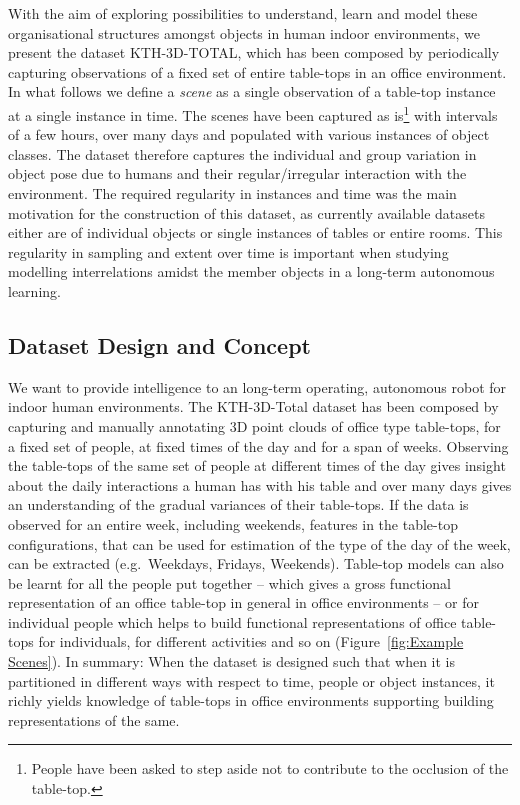 \documentclass[letterpaper, 10 pt, conference]{ieeeconf}  %
\begin{document}
With the aim of exploring possibilities to understand, learn and model these organisational structures amongst objects in human indoor 
environments, we present the dataset KTH-3D-TOTAL, which has been composed by periodically capturing observations of a fixed set of entire 
table-tops in an office environment. In what follows we define a \textit{scene} as a single observation of a table-top instance at a single 
instance in time. The scenes have been captured as is\footnote{People have been asked to step aside not to contribute to the occlusion of 
the table-top.} with intervals of a few hours, over many days and populated with various instances of object classes. The dataset therefore 
captures the individual and group variation in object pose due to humans and their regular/irregular interaction with the environment. The 
required regularity in instances and time was the main motivation for the construction of this dataset, as currently available datasets 
either are of individual objects or single instances of tables or entire rooms. This regularity in sampling and extent over time is 
important when studying modelling interrelations amidst the member objects in a long-term autonomous learning. 

\subsection{Dataset Design and Concept}
\label{ssec:Dataset Design and Concept}
We want to provide intelligence to an long-term operating, autonomous robot for indoor human environments. The KTH-3D-Total
dataset has been composed by capturing and manually annotating 3D point clouds of office type table-tops, for a fixed set of 
people, at fixed times of the 
day and for a span of weeks. Observing the table-tops of the same set of people at different times of the day gives insight about the daily 
interactions a human has with his table and over many days gives an understanding of the gradual variances of their table-tops. If the data 
is observed for an entire week, including weekends, features in the table-top configurations, that can be used for estimation of the type of 
the day of the week, can be extracted (e.g.\ Weekdays, Fridays, Weekends). Table-top models can also be learnt for all the people put 
together -- which gives a gross functional representation of an office table-top in general in office environments -- or for individual 
people which helps to build functional representations of office table-tops for individuals, for different activities and so on 
(Figure~\ref{fig:Example Scenes}). 
In summary: When the dataset is designed such that when it is partitioned in different ways with respect to time, people or object instances, it richly yields knowledge 
of table-tops in office environments supporting building representations of the same.
\end{document}

